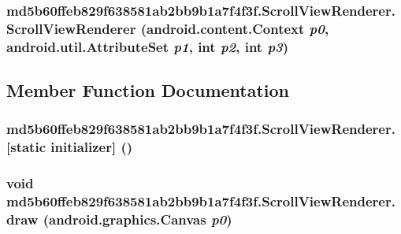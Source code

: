 \hypertarget{classmd5b60ffeb829f638581ab2bb9b1a7f4f3f_1_1_scroll_view_renderer_4e029c6c82f12c4db7e20a8ec6d888e9}{
\subsubsection[{ScrollViewRenderer}]{\setlength{\rightskip}{0pt plus 5cm}md5b60ffeb829f638581ab2bb9b1a7f4f3f.ScrollViewRenderer.ScrollViewRenderer (android.content.Context {\em p0}, \/  android.util.AttributeSet {\em p1}, \/  int {\em p2}, \/  int {\em p3})}}
\label{classmd5b60ffeb829f638581ab2bb9b1a7f4f3f_1_1_scroll_view_renderer_4e029c6c82f12c4db7e20a8ec6d888e9}




\subsection{Member Function Documentation}
\hypertarget{classmd5b60ffeb829f638581ab2bb9b1a7f4f3f_1_1_scroll_view_renderer_4c489a65814fa0175b2229056c3ee642}{
\subsubsection[{[static initializer]}]{\setlength{\rightskip}{0pt plus 5cm}md5b60ffeb829f638581ab2bb9b1a7f4f3f.ScrollViewRenderer.\mbox{[}static initializer\mbox{]} ()}}
\label{classmd5b60ffeb829f638581ab2bb9b1a7f4f3f_1_1_scroll_view_renderer_4c489a65814fa0175b2229056c3ee642}


\hypertarget{classmd5b60ffeb829f638581ab2bb9b1a7f4f3f_1_1_scroll_view_renderer_ae3343e25e199d02c22d1e33b37138a3}{
\subsubsection[{draw}]{\setlength{\rightskip}{0pt plus 5cm}void md5b60ffeb829f638581ab2bb9b1a7f4f3f.ScrollViewRenderer.draw (android.graphics.Canvas {\em p0})}}
\label{classmd5b60ffeb829f638581ab2bb9b1a7f4f3f_1_1_scroll_view_renderer_ae3343e25e199d02c22d1e33b37138a3}


